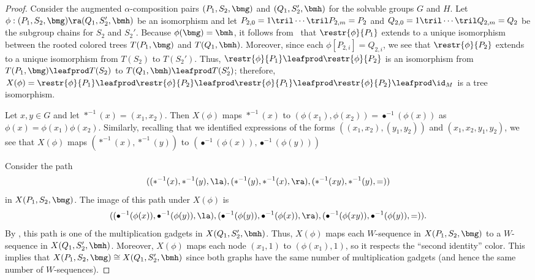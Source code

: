 \begin{proof}
  Consider the augmented $\alpha$-composition pairs $(P_1, S_2, \bmg)$ and $(Q_1, S_2', \bmh)$ for the solvable groups $G$ and $H$.  Let $\phi : (P_1, S_2, \bmg) \ra (Q_1, S_2', \bmh)$ be an isomorphism and let $P_{2, 0} = 1 \tril \cdots \tril P_{2, m} = P_2$ and $Q_{2, 0} = 1 \tril \cdots \tril Q_{2, m} = Q_2$ be the subgroup chains for $S_2$ and $S_2'$.  Because $\phi(\bmg) = \bmh$, it follows from~ that $\restr{\phi}{P_1}$ extends to a unique isomorphism between the rooted colored trees $T(P_1, \bmg)$ and $T(Q_1, \bmh)$.  Moreover, since each $\phi[P_{2, i}] = Q_{2, i}$, we see that $\restr{\phi}{P_2}$ extends to a unique isomorphism from $T(S_2)$ to $T(S_2')$.  Thus, $\restr{\phi}{P_1} \leafprod \restr{\phi}{P_2}$ is an isomorphism from $T(P_1, \bmg) \leafprod T(S_2)$ to $T(Q_1, \bmh) \leafprod T(S_2')$; therefore, $X(\phi) = \restr{\phi}{P_1} \leafprod \restr{\phi}{P_2} \leafprod \restr{\phi}{P_1} \leafprod \restr{\phi}{P_2} \leafprod \id_M$ is a tree isomorphism.

  Let $x, y \in G$ and let $*^{-1}(x) = (x_1, x_2)$.  Then $X(\phi)$ maps $*^{-1}(x)$ to $(\phi(x_1), \phi(x_2)) = \bullet^{-1}(\phi(x))$ as $\phi(x) = \phi(x_1) \phi(x_2)$.  Similarly, recalling that we identified expressions of the forms $((x_1, x_2), (y_1, y_2))$ and $(x_1, x_2, y_1, y_2)$, we see that $X(\phi)$ maps $(*^{-1}(x), *^{-1}(y))$ to $(\bullet^{-1}(\phi(x)), \bullet^{-1}(\phi(y)))$

  Consider the path
  \begin{equation*}
    ((*^{-1}(x), *^{-1}(y), \la), (*^{-1}(y), *^{-1}(x), \ra), (*^{-1}(x y), *^{-1}(y), =))
  \end{equation*}
  in $X(P_1, S_2, \bmg)$.  The image of this path under $X(\phi)$ is
  \begin{equation*}
    ((\bullet^{-1}(\phi(x)), \bullet^{-1}(\phi(y)), \la), (\bullet^{-1}(\phi(y)), \bullet^{-1}(\phi(x)), \ra), (\bullet^{-1}(\phi(x y)), \bullet^{-1}(\phi(y)), =)).
  \end{equation*}
  By , this path is one of the multiplication gadgets in $X(Q_1, S_2', \bmh)$.  Thus, $X(\phi)$ maps each $W$-sequence in $X(P_1, S_2, \bmg)$ to a $W$-sequence in $X(Q_1, S_2', \bmh)$.  Moreover,
 $X(\phi)$ maps each node $(x_1, 1)$ to $(\phi(x_1), 1)$, so it respects the ``second identity'' color.  This implies that $X(P_1, S_2, \bmg) \cong X(Q_1, S_2', \bmh)$ since both graphs have the same number of multiplication gadgets (and hence the same number of $W$-sequences).
\end{proof}

